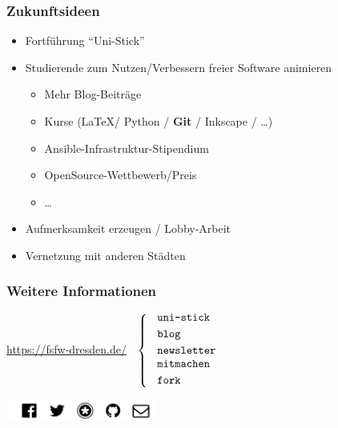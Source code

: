 \documentclass{beamer}
\begin{document}

\begin{frame}[label=ct3]
  \frametitle{Zukunftsideen}

  \begin{itemize}
  \item Fortführung "`Uni-Stick"'
  \item Studierende zum Nutzen/Verbessern freier Software animieren
    \begin{itemize}
    \item Mehr Blog-Beiträge
    \item Kurse (\LaTeX / Python /\textbf{ Git} / Inkscape / \dots)
    \item Ansible-Infrastruktur-Stipendium
    \item OpenSource-Wettbewerb/Preis
    \item \dots
    \end{itemize}

    \bigskip

  \item Aufmerksamkeit erzeugen / Lobby-Arbeit

    \bigskip

  \item Vernetzung mit anderen Städten

  \end{itemize}

\end{frame}


\begin{frame}[label=ct4]
  \frametitle{Weitere Informationen}

  \onslide<+->

  \begin{center}
    \url{https://fsfw-dresden.de/}
    $\;\;\left\{\;\;\text{
        \parbox{2.3cm}{
          \texttt{uni-stick}\\[1mm]
          \texttt{blog}\\[1mm]
          \texttt{newsletter}
          \texttt{mitmachen}\\[1mm]
          \texttt{fork}\\[-3mm]
        }}
    \right.$

    \vspace*{2\bigskipamount}

    \includegraphics[width=50mm]{img-src/fsfw-netzwerke}
  \end{center}

\end{frame}
\end{document}

